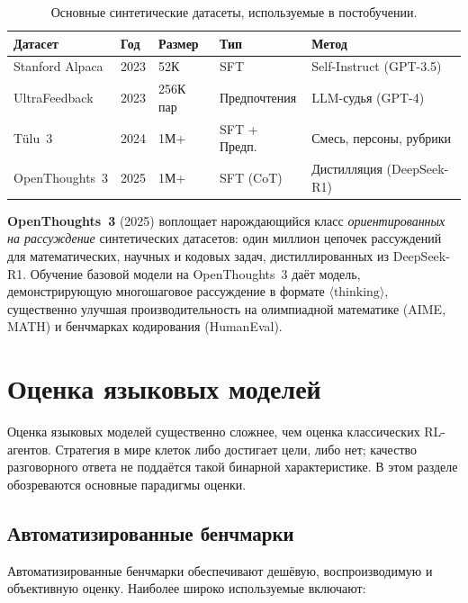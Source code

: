 \begin{table}[ht]
\centering
\caption{Основные синтетические датасеты, используемые в постобучении.}
\label{tab:synthetic-datasets}
\begin{tabular}{lllll}
\toprule
\textbf{Датасет} & \textbf{Год} & \textbf{Размер} & \textbf{Тип} & \textbf{Метод} \\
\midrule
Stanford Alpaca     & 2023 & 52К    & SFT          & Self-Instruct (GPT-3.5) \\
UltraFeedback       & 2023 & 256К пар & Предпочтения  & LLM-судья (GPT-4) \\
T\"{u}lu~3          & 2024 & 1М+    & SFT + Предп.  & Смесь, персоны, рубрики \\
OpenThoughts~3      & 2025 & 1М+    & SFT (CoT)    & Дистилляция (DeepSeek-R1) \\
\bottomrule
\end{tabular}
\end{table}

\textbf{OpenThoughts~3} (2025) воплощает нарождающийся класс \emph{ориентированных на рассуждение} синтетических датасетов: один миллион цепочек рассуждений для математических, научных и кодовых задач, дистиллированных из DeepSeek-R1. Обучение базовой модели на OpenThoughts~3 даёт модель, демонстрирующую многошаговое рассуждение в формате $\langle\text{thinking}\rangle$, существенно улучшая производительность на олимпиадной математике (AIME, MATH) и бенчмарках кодирования (HumanEval).

\section{Оценка языковых моделей}
\label{sec:lm-eval}

Оценка языковых моделей существенно сложнее, чем оценка классических RL-агентов. Стратегия в мире клеток либо достигает цели, либо нет; качество разговорного ответа не поддаётся такой бинарной характеристике. В этом разделе обозреваются основные парадигмы оценки.

\subsection{Автоматизированные бенчмарки}

Автоматизированные бенчмарки обеспечивают дешёвую, воспроизводимую и объективную оценку. Наиболее широко используемые включают:

